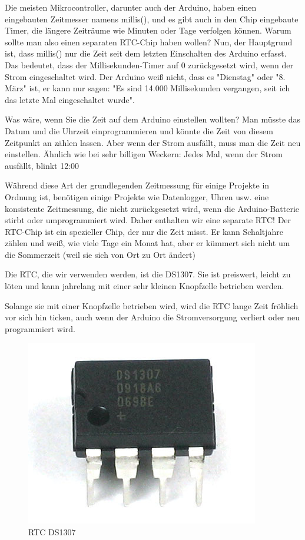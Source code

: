 \documentclass[conference]{IEEEtran}
\begin{document}
Die meisten Mikrocontroller, darunter auch der Arduino, haben einen eingebauten Zeitmesser namens millis(), und es gibt auch in den Chip eingebaute Timer, die längere Zeiträume wie Minuten oder Tage verfolgen können. Warum sollte man also einen separaten RTC-Chip haben wollen? Nun, der Hauptgrund ist, dass millis() nur die Zeit seit dem letzten Einschalten des Arduino erfasst. Das bedeutet, dass der Millisekunden-Timer auf 0 zurückgesetzt wird, wenn der Strom eingeschaltet wird. Der Arduino weiß nicht, dass es "Dienstag" oder "8. März" ist, er kann nur sagen: "Es sind 14.000 Millisekunden vergangen, seit ich das letzte Mal eingeschaltet wurde".

Was wäre, wenn Sie die Zeit auf dem Arduino einstellen wollten? Man müsste das Datum und die Uhrzeit einprogrammieren und könnte die Zeit von diesem Zeitpunkt an zählen lassen. Aber wenn der Strom ausfällt, muss man die Zeit neu einstellen. Ähnlich wie bei sehr billigen Weckern: Jedes Mal, wenn der Strom ausfällt, blinkt 12:00

Während diese Art der grundlegenden Zeitmessung für einige Projekte in Ordnung ist, benötigen einige Projekte wie Datenlogger, Uhren usw. eine konsistente Zeitmessung, die nicht zurückgesetzt wird, wenn die Arduino-Batterie stirbt oder umprogrammiert wird. Daher enthalten wir eine separate RTC! Der RTC-Chip ist ein spezieller Chip, der nur die Zeit misst. Er kann Schaltjahre zählen und weiß, wie viele Tage ein Monat hat, aber er kümmert sich nicht um die Sommerzeit (weil sie sich von Ort zu Ort ändert)

Die RTC, die wir verwenden werden, ist die DS1307. Sie ist preiswert, leicht zu löten und kann jahrelang mit einer sehr kleinen Knopfzelle betrieben werden.

Solange sie mit einer Knopfzelle betrieben wird, wird die RTC lange Zeit fröhlich vor sich hin ticken, auch wenn der Arduino die Stromversorgung verliert oder neu programmiert wird.

\begin{figure}
	\begin{center}
		\includegraphics[scale=0.35]{rtc}
	\end{center}
	\caption{RTC DS1307}
\end{figure}
\end{document}
